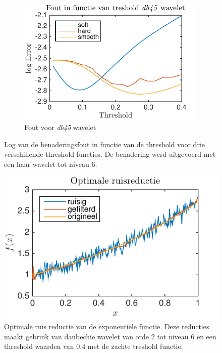 \begin{figure}
\begin{subfigure}[b]{0.4\textwidth}
        \includegraphics[width=\textwidth]{../src/denoising/error_1d/error_exp_db45_10}
        \caption{Fout voor \textit{db45} wavelet}
    \end{subfigure}
    \caption{Log van de benaderingsfout in functie van de threshold voor drie verschillende threshold functies. De benadering werd uitgevoerd met een haar wavelet tot niveau 6.}\label{fig:error_exp_10}
\end{figure}




\begin{figure}
\centering
\includegraphics[width=0.7\linewidth]{../src/denoising/error_1d/Optimale_ruisReductie}
\caption{Optimale ruis reductie van de exponenti\"ele functie. Deze reducties maakt gebruik van daubechie wavelet van orde 2 tot niveau 6 en een threshold waarden van 0.4 met  de zachte treshold functie.}
\label{fig:Optimale_ruisReductie}
\end{figure}


